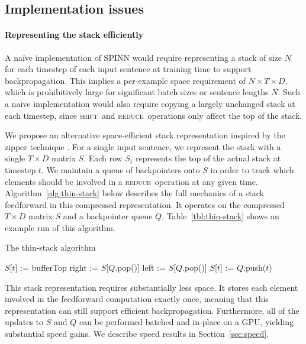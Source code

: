 \documentclass[11pt]{article}
\newcommand{\shift}{\textsc{shift}}
\newcommand{\reduce}{\textsc{reduce}}
\begin{document}
\subsection{Implementation issues}

\paragraph{Representing the stack efficiently}

A na\"ive implementation of SPINN would require representing a stack of size $N$ for each timestep of each input sentence at training time to support backpropagation. This implies a per-example space requirement of $N \times T \times D$, which is prohibitively large for significant batch sizes or sentence lengths $N$. Such a naive implementation would also require copying a largely unchanged stack at each timestep, since \shift~and \reduce~operations only affect the top of the stack.

We propose an alternative space-efficient stack representation inspired by the zipper technique \citep{huet1997zipper}. For a single input sentence, we represent the stack with a single $T \times D$ matrix $S$. Each row $S_t$ represents the top of the actual stack at timestep $t$. We maintain a queue of backpointers onto $S$ in order to track which elements should be involved in a \reduce~operation at any given time. Algorithm~\ref{alg:thin-stack} below describes the full mechanics of a stack feedforward in this compressed representation. It operates on the compressed $T \times D$ matrix $S$ and a backpointer queue $Q$. Table~\ref{tbl:thin-stack} shows an example run of this algorithm.

\begin{algorithm}[t]
\caption{The thin-stack algorithm}
\label{alg:thin-stack}
\begin{algorithmic}[1]
    \If{op = \shift}
      \State $S$[$t$] := bufferTop
    \ElsIf{op = \reduce}
      \State right := $S$[$Q$.pop()]
      \State left := $S$[$Q$.pop()]
      \State $S$[$t$] := 
    \EndIf
    \State $Q$.push($t$)
  \EndFunction
\end{algorithmic}
\end{algorithm}

This stack representation requires substantially less space. It stores each element involved in the feedforward computation exactly once, meaning that this representation can still support efficient backpropagation. Furthermore, all of the updates to $S$ and $Q$ can be performed batched and in-place on a GPU, yielding substantial speed gains. We describe speed results in Section~\ref{sec:speed}.
\end{document}
